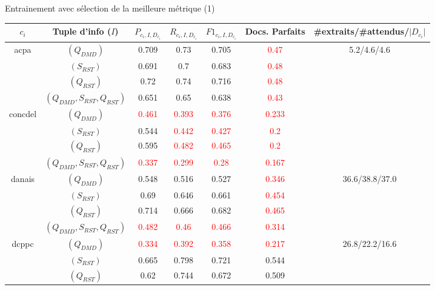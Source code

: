 \documentclass[newPxFont,pagenumber]{beamer}
\begin{document}
\begin{frame}{Entrainement avec sélection de la meilleure métrique (1)}
\begin{table}[!htbp]
\tiny
\begin{tabular}{|c|c|c|c|c|c|c|}
\hline
$c_i$ & Tuple d'info ($I$) &  $P_{c_i,I,D_{c_i}}$ & $R_{c_i,I,D_{c_i}}$ & $F1_{c_i,I,D_{c_i}}$ & Docs. Parfaits & \#extraits/\#attendus/$\vert D_{c_i}  \vert$\\ \hline
\multirow{4}{*}{acpa} & $(Q_{DMD})$ & 0.709 & 0.73 & 0.705 & \textcolor{red}{0.47} & \multirow{5}{*}{5.2/4.6/4.6} \\ 
 & $(S_{RST})$ & 0.691 & 0.7 & 0.683 & \textcolor{red}{0.48} &  \\ 
 & $(Q_{RST})$ & 0.72 & 0.74 & 0.716 & \textcolor{red}{0.48} &  \\ 
 & $(Q_{DMD},S_{RST}, Q_{RST})$ & 0.651 & 0.65 & 0.638 & \textcolor{red}{0.43} &  \\  \hline
\multirow{4}{*}{concdel}  & $(Q_{DMD})$ & \textcolor{red}{0.461} & \textcolor{red}{0.393} & \textcolor{red}{0.376} & \textcolor{red}{0.233} & \multirow{5}{*}{11.6/11.6/6.0} \\ 
 & $(S_{RST})$ & 0.544 & \textcolor{red}{0.442} & \textcolor{red}{0.427} & \textcolor{red}{0.2} &  \\ 
 & $(Q_{RST})$ & 0.595 & \textcolor{red}{0.482} & \textcolor{red}{0.465} & \textcolor{red}{0.2} &  \\ 
 & $(Q_{DMD},S_{RST}, Q_{RST})$ & \textcolor{red}{0.337} & \textcolor{red}{0.299} & \textcolor{red}{0.28} & \textcolor{red}{0.167} &  \\  \hline
 \multirow{4}{*}{danais} & $(Q_{DMD})$ & 0.548 & 0.516 & 0.527 & \textcolor{red}{0.346} & \multirow{4}{*}{36.6/38.8/37.0} \\ 
 & $(S_{RST})$ & 0.69 & 0.646 & 0.661 & \textcolor{red}{0.454} &  \\ 
 & $(Q_{RST})$ & 0.714 & 0.666 & 0.682 & \textcolor{red}{0.465} &  \\ 
 & $(Q_{DMD},S_{RST}, Q_{RST})$ & \textcolor{red}{0.482} & \textcolor{red}{0.46} & \textcolor{red}{0.466} & \textcolor{red}{0.314} &  \\  \hline
\multirow{4}{*}{dcppc} & $(Q_{DMD})$ & \textcolor{red}{0.334} & \textcolor{red}{0.392} & \textcolor{red}{0.358} & \textcolor{red}{0.217} & \multirow{4}{*}{26.8/22.2/16.6} \\ 
 & $(S_{RST})$ & 0.665 & 0.798 & 0.721 & 0.544 &  \\ 
 & $(Q_{RST})$ & 0.62 & 0.744 & 0.672 & 0.509 &  \\ 

\end{tabular}
\end{table}
\end{frame}
\end{document}
